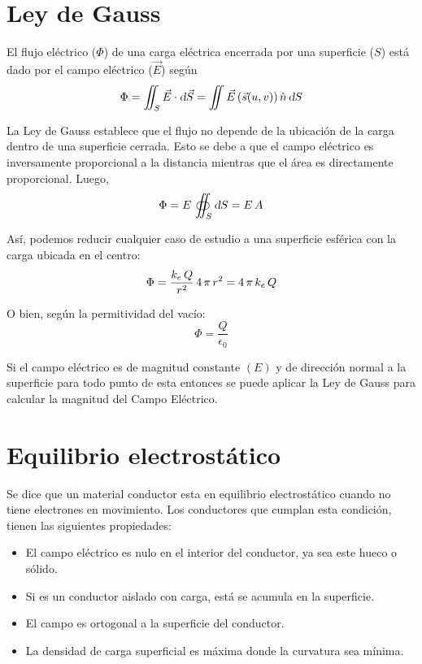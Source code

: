 \documentclass[a5paper,12pt,twoside]{book}
\begin{document}
\section{Ley de Gauss}

El flujo eléctrico ($\Phi$) de una carga eléctrica encerrada por una superficie ($S$) está dado por el campo eléctrico ($\Vec{E}$) según
\begin{equation*}
    \Phi = \iint_S \Vec{E} \cdot \textsl{d} \Vec{S} = \iint \Vec{E} \left(\Vec{s}(u,v)\right) \hat{n} \, \textsl{d} S
\end{equation*}

La Ley de Gauss establece que el flujo no depende de la ubicación de la carga dentro de una superficie cerrada. Esto se debe a que el campo eléctrico es inversamente proporcional a la distancia mientras que el área es directamente proporcional. Luego, 
\begin{equation*}
    \Phi = E \, \oiint_S \textsl{d} S = E \, A
\end{equation*}

Así, podemos reducir cualquier caso de estudio a una superficie esférica con la carga ubicada en el centro:
\begin{equation*}
    \Phi = \frac{k_e \, Q}{r^2} \, 4 \, \pi \, r^2 = 4 \, \pi \, k_e \, Q
\end{equation*}

O bien, según la permitividad del vacío:
\begin{equation*}
    \Phi = \frac{Q}{\epsilon_0}
\end{equation*}

Si el campo eléctrico es de magnitud constante $(E)$ y de dirección normal a la superficie para todo punto de esta entonces se puede aplicar la Ley de Gauss para calcular la magnitud del Campo Eléctrico.


\section{Equilibrio electrostático}

Se dice que un material conductor esta en equilibrio electrostático cuando no tiene electrones en movimiento.
Los conductores que cumplan esta condición, tienen las siguientes propiedades:

\begin{itemize}
\item El campo eléctrico es nulo en el interior del conductor, ya sea este hueco o sólido.

\item Si es un conductor aislado con carga, está se acumula en la superficie.

\item El campo es ortogonal a la superficie del conductor.

\item La densidad de carga superficial es máxima donde la curvatura sea mínima.
\end{itemize}
\end{document}
